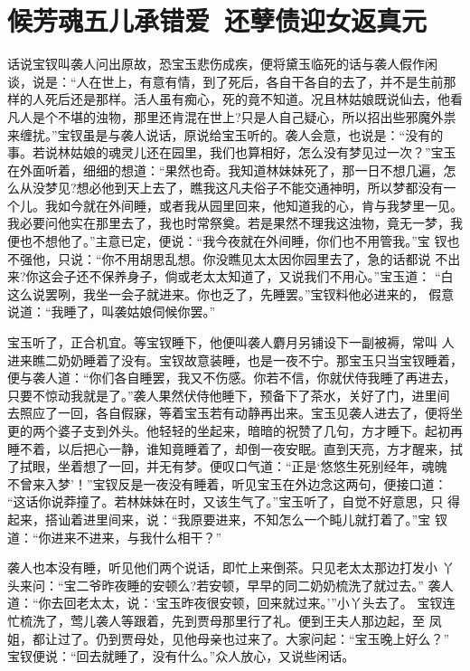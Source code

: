 \chapter{候芳魂五儿承错爱~还孽债迎女返真元}

话说宝钗叫袭人问出原故，恐宝玉悲伤成疾，便将黛玉临死的话与袭人假作闲
谈，说是：“人在世上，有意有情，到了死后，各自干各自的去了，并不是生前那
样的人死后还是那样。活人虽有痴心，死的竟不知道。况且林姑娘既说仙去，他看
凡人是个不堪的浊物，那里还肯混在世上?只是人自己疑心，所以招出些邪魔外祟
来缠扰。”宝钗虽是与袭人说话，原说给宝玉听的。袭人会意，也说是：“没有的
事。若说林姑娘的魂灵儿还在园里，我们也算相好，怎么没有梦见过一次？”宝玉
在外面听着，细细的想道：“果然也奇。我知道林妹妹死了，那一日不想几遍，怎
么从没梦见?想必他到天上去了，瞧我这凡夫俗子不能交通神明，所以梦都没有一
个儿。我如今就在外间睡，或者我从园里回来，他知道我的心，肯与我梦里一见。
我必要问他实在那里去了，我也时常祭奠。若是果然不理我这浊物，竟无一梦，我
便也不想他了。”主意已定，便说：“我今夜就在外间睡，你们也不用管我。”宝
钗也不强他，只说：“你不用胡思乱想。你没瞧见太太因你园里去了，急的话都说
不出来?你这会子还不保养身子，倘或老太太知道了，又说我们不用心。”宝玉道：
“白这么说罢咧，我坐一会子就进来。你也乏了，先睡罢。”宝钗料他必进来的，
假意说道：“我睡了，叫袭姑娘伺候你罢。”

宝玉听了，正合机宜。等宝钗睡下，他便叫袭人麝月另铺设下一副被褥，常叫
人进来瞧二奶奶睡着了没有。宝钗故意装睡，也是一夜不宁。那宝玉只当宝钗睡着，
便与袭人道：“你们各自睡罢，我又不伤感。你若不信，你就伏侍我睡了再进去，
只要不惊动我就是了。”袭人果然伏侍他睡下，预备下了茶水，关好了门，进里间
去照应了一回，各自假寐，等着宝玉若有动静再出来。宝玉见袭人进去了，便将坐
更的两个婆子支到外头。他轻轻的坐起来，暗暗的祝赞了几句，方才睡下。起初再
睡不着，以后把心一静，谁知竟睡着了，却倒一夜安眠。直到天亮，方才醒来，拭
了拭眼，坐着想了一回，并无有梦。便叹口气道：“正是‘悠悠生死别经年，魂魄
不曾来入梦’！”宝钗反是一夜没有睡着，听见宝玉在外边念这两句，便接口道：
“这话你说莽撞了。若林妹妹在时，又该生气了。”宝玉听了，自觉不好意思，只
得起来，搭讪着进里间来，说：“我原要进来，不知怎么一个盹儿就打着了。”宝
钗道：“你进来不进来，与我什么相干？”

袭人也本没有睡，听见他们两个说话，即忙上来倒茶。只见老太太那边打发小
丫头来问：“宝二爷昨夜睡的安顿么?若安顿，早早的同二奶奶梳洗了就过去。”
袭人道：“你去回老太太，说：‘宝玉昨夜很安顿，回来就过来。’”小丫头去了。
宝钗连忙梳洗了，莺儿袭人等跟着，先到贾母那里行了礼。便到王夫人那边起，至
凤姐，都让过了。仍到贾母处，见他母亲也过来了。大家问起：“宝玉晚上好么？”
宝钗便说：“回去就睡了，没有什么。”众人放心，又说些闲话。

